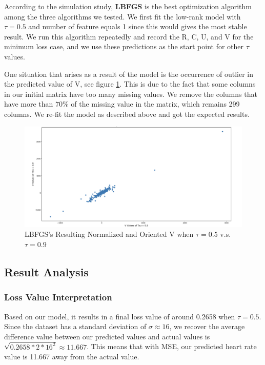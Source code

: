 \documentclass{article}
\begin{document}
According to the simulation study, \textbf{LBFGS} is the best optimization algorithm among the three algorithms we tested. We first fit the low-rank model with $\tau = 0.5$ and number of feature equals 1 since this would gives the most stable result. We run this algorithm repeatedly and record the R, C, U, and V for the minimum loss case, and we use these predictions as the start point for other $\tau$ values.

One situation that arises as a result of the model is the occurrence of outlier in the predicted value of V, see figure \ref{outlier}.
This is due to the fact that some columns in our initial matrix have too many missing values. We remove the columns that have more than $70\%$ of the missing value in the matrix, which remains 299 columns. We re-fit the model as described above and got the expected results.

\begin{figure}[ht]
\centering
\includegraphics[width=16cm]{outlier.png} 
\caption{LBFGS's Resulting Normalized and Oriented V when $\tau = 0.5$ v.s. $\tau = 0.9$} 
\label{outlier} 
\end{figure}



\subsection{Result Analysis}
\subsubsection{Loss Value Interpretation}
Based on our model, it results in a final loss value of around 0.2658 when $\tau = 0.5$. Since the dataset has a standard deviation of $\sigma \approx 16$, we recover the average difference value between our predicted values and actual values is $\displaystyle\sqrt{0.2658 * 2 * 16^2} \approx 11.667$. This means that with MSE, our predicted heart rate value is 11.667 away from the actual value.\\
\end{document}
